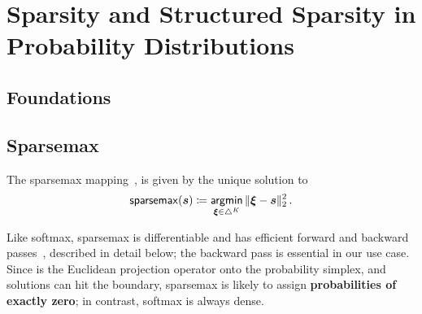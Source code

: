 \section{Sparsity and Structured Sparsity in Probability Distributions}
\label{sec:sparsity_background}

\subsection{Foundations}

\subsection{Sparsemax}\label{sec:sparsemax_bg}

The sparsemax mapping~\citep{martins2016softmax}, is given by the unique solution to
\begin{equation}\label{eq:sparsemax}
    \operatorname*{\mathsf{sparsemax}}(\bm{s}) \coloneqq \operatorname*{\mathsf{argmin}}_{\bm{\xi} \in \triangle^K} \| \bm{\xi} - \bm{s} \|_2^2\,.
\end{equation}

Like softmax, sparsemax is differentiable and has efficient forward and backward
passes~\citep{Held1974,martins2016softmax}, described in detail below;
the backward pass is essential in our use case. Since
 is the Euclidean projection operator onto the probability
simplex, and solutions can hit the boundary, sparsemax is likely to assign {\bf
        probabilities of exactly zero}; in contrast, softmax is always dense.

